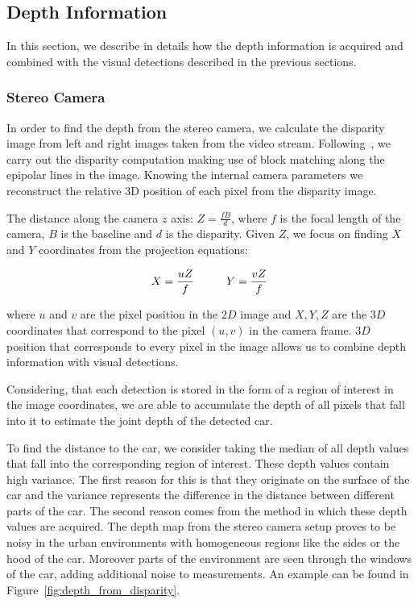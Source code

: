 
\subsection{Depth Information}\label{sub:depth_information}

In this section, we describe in details how the depth information is acquired
and combined with the visual detections described in the previous sections.

\subsubsection{Stereo Camera}\label{ssub:stereo_camera}

In order to find the depth from the stereo camera, we calculate the disparity
image from left and right images taken from the video stream.
Following~\citet{konolige}, we carry out the disparity computation making use
of block matching along the epipolar lines in the image. Knowing the internal
camera parameters we reconstruct the relative 3D position of each pixel from
the disparity image.

The distance along the camera $z$ axis: $Z = \frac{fB}{d}$, where $f$ is the
focal length of the camera, $B$ is the baseline and $d$ is the disparity.
Given $Z$, we focus on finding $X$ and $Y$ coordinates from the projection
equations:

\begin{equation}
X = \frac{uZ}{f}
\hspace{10 mm}
Y = \frac{vZ}{f}
\end{equation}

where $u$ and $v$ are the pixel position in the $2D$ image and $X, Y, Z$ are
the $3D$ coordinates that correspond to the pixel $(u,v)$ in the camera frame.
$3D$ position that corresponds to every pixel in the image allows us to
combine depth information with visual detections.

Considering, that each detection is stored in the form of a region of interest
in the image coordinates, we are able to accumulate the depth of all pixels
that fall into it to estimate the joint depth of the detected car.

To find the distance to the car, we consider taking the median of all depth
values that fall into the corresponding region of interest. These depth values
contain high variance. The first reason for this is that they originate on the
surface of the car and the variance represents the difference in the distance
between different parts of the car. The second reason comes from the method in
which these depth values are acquired. The depth map from the stereo camera
setup proves to be noisy in the urban environments with homogeneous regions
like the sides or the hood of the car. Moreover parts of the environment are
seen through the windows of the car, adding additional noise to measurements.
An example can be found in Figure~\ref{fig:depth_from_disparity}.

